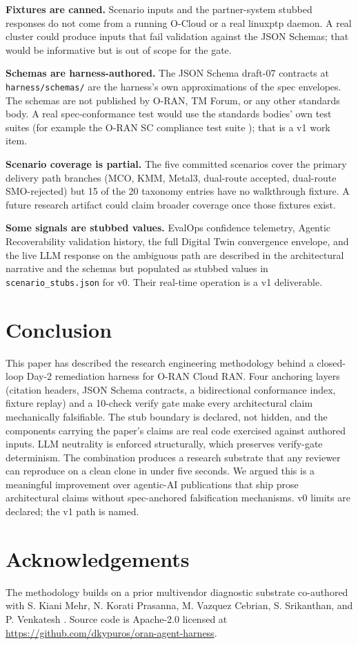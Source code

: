 \documentclass[twocolumn,10pt,a4paper]{article}
\begin{document}
\textbf{Fixtures are canned.} Scenario inputs and the partner-system stubbed responses do not come from a running O-Cloud or a real linuxptp daemon. A real cluster could produce inputs that fail validation against the JSON Schemas; that would be informative but is out of scope for the gate.

\textbf{Schemas are harness-authored.} The JSON Schema draft-07 contracts at \texttt{harness/schemas/} are the harness's own approximations of the spec envelopes. The schemas are not published by O-RAN, TM Forum, or any other standards body. A real spec-conformance test would use the standards bodies' own test suites (for example the O-RAN SC compliance test suite \cite{oran_sc_it_test}); that is a v1 work item.

\textbf{Scenario coverage is partial.} The five committed scenarios cover the primary delivery path branches (MCO, KMM, Metal3, dual-route accepted, dual-route SMO-rejected) but 15 of the 20 taxonomy entries have no walkthrough fixture. A future research artifact could claim broader coverage once those fixtures exist.

\textbf{Some signals are stubbed values.} EvalOps confidence telemetry, Agentic Recoverability validation history, the full Digital Twin convergence envelope, and the live LLM response on the ambiguous path are described in the architectural narrative and the schemas but populated as stubbed values in \texttt{scenario\_stubs.json} for v0. Their real-time operation is a v1 deliverable.

\section{Conclusion}
\label{sec:conclude}

This paper has described the research engineering methodology behind a closed-loop Day-2 remediation harness for O-RAN Cloud RAN. Four anchoring layers (citation headers, JSON Schema contracts, a bidirectional conformance index, fixture replay) and a 10-check verify gate make every architectural claim mechanically falsifiable. The stub boundary is declared, not hidden, and the components carrying the paper's claims are real code exercised against authored inputs. LLM neutrality is enforced structurally, which preserves verify-gate determinism. The combination produces a research substrate that any reviewer can reproduce on a clean clone in under five seconds. We argued this is a meaningful improvement over agentic-AI publications that ship prose architectural claims without spec-anchored falsification mechanisms. v0 limits are declared; the v1 path is named.

\section*{Acknowledgements}

The methodology builds on a prior multivendor diagnostic substrate co-authored with S. Kiani Mehr, N. Korati Prasanna, M. Vazquez Cebrian, S. Srikanthan, and P. Venkatesh \cite{multivendor_blog_2026}. Source code is Apache-2.0 licensed at \url{https://github.com/dkypuros/oran-agent-harness}.



\end{document}
